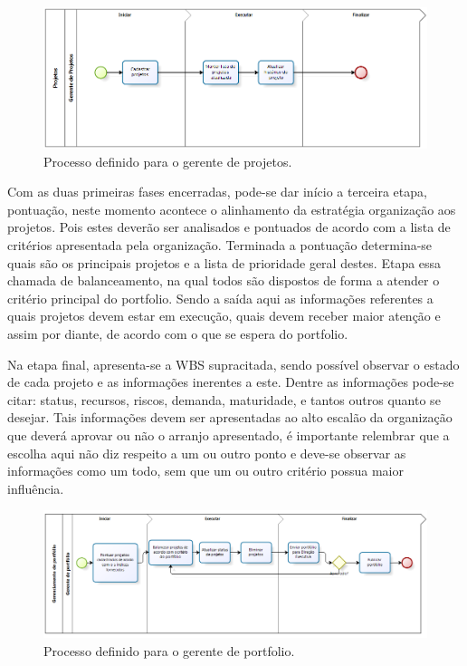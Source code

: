 \documentclass[12pt,a4paper,ruledheader,tocpage=prefix,floatnumber=continuous,pagestart=folhaderosto,font=times]{abnt}
\begin{document}
\begin{figure}[H]
\centering
\includegraphics[width=.9\textwidth]{Projetos.png}
\caption{Processo definido para o gerente de projetos.}
\end{figure}

Com as duas primeiras fases encerradas, pode-se dar início a terceira etapa, pontuação, neste momento acontece o alinhamento da estratégia organização 
aos projetos. Pois estes deverão ser analisados e pontuados de acordo com a lista de critérios apresentada pela organização. Terminada a pontuação 
determina-se quais são os principais projetos e a lista de prioridade geral destes. Etapa essa chamada de balanceamento, na qual todos são dispostos de 
forma a atender o critério principal do portfolio. Sendo a saída aqui as informações referentes a quais projetos devem estar em execução, quais devem 
receber maior atenção e assim por diante, de acordo com o que se espera do portfolio.

Na etapa final, apresenta-se a WBS supracitada, sendo possível observar o estado de cada projeto e as informações inerentes a este. Dentre as informações
pode-se citar: status, recursos, riscos, demanda, maturidade, e tantos outros quanto se desejar. Tais informações devem ser apresentadas ao alto escalão 
da organização que deverá aprovar ou não o arranjo apresentado, é importante relembrar que a escolha aqui não diz respeito a um ou outro ponto e deve-se 
observar as informações como um todo, sem que um ou outro critério possua maior influência. 

\begin{figure}[H]
\centering
\includegraphics[width=.9\textwidth]{GerenciaPortfolio.png}
\caption{Processo definido para o gerente de portfolio.}
\end{figure}
\end{document}
